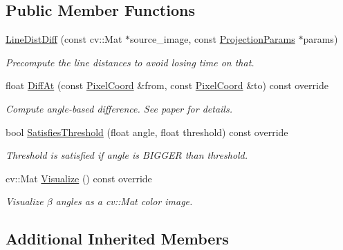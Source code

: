 \subsection*{Public Member Functions}
\begin{DoxyCompactItemize}
\item 
\hyperlink{classdepth__clustering_1_1LineDistDiff_af922d3e19bc52a2fdbf36317fc474d88}{Line\-Dist\-Diff} (const cv\-::\-Mat $\ast$source\-\_\-image, const \hyperlink{classdepth__clustering_1_1ProjectionParams}{Projection\-Params} $\ast$params)
\begin{DoxyCompactList}\small\item\em Precompute the line distances to avoid losing time on that. \end{DoxyCompactList}\item 
float \hyperlink{classdepth__clustering_1_1LineDistDiff_a839eee44b14de26d85e6dbad5e37b356}{Diff\-At} (const \hyperlink{structdepth__clustering_1_1PixelCoord}{Pixel\-Coord} \&from, const \hyperlink{structdepth__clustering_1_1PixelCoord}{Pixel\-Coord} \&to) const override
\begin{DoxyCompactList}\small\item\em Compute angle-\/based difference. See paper for details. \end{DoxyCompactList}\item 
\hypertarget{classdepth__clustering_1_1LineDistDiff_ae9debede2cffd6bb40ca4c4a82c52f61}{bool \hyperlink{classdepth__clustering_1_1LineDistDiff_ae9debede2cffd6bb40ca4c4a82c52f61}{Satisfies\-Threshold} (float angle, float threshold) const override}\label{classdepth__clustering_1_1LineDistDiff_ae9debede2cffd6bb40ca4c4a82c52f61}

\begin{DoxyCompactList}\small\item\em Threshold is satisfied if angle is B\-I\-G\-G\-E\-R than threshold. \end{DoxyCompactList}\item 
cv\-::\-Mat \hyperlink{classdepth__clustering_1_1LineDistDiff_a7feaf820589ccfb47786d5124a74d725}{Visualize} () const override
\begin{DoxyCompactList}\small\item\em Visualize $\beta$ angles as a {\ttfamily cv\-::\-Mat} color image. \end{DoxyCompactList}\end{DoxyCompactItemize}
\subsection*{Additional Inherited Members}


